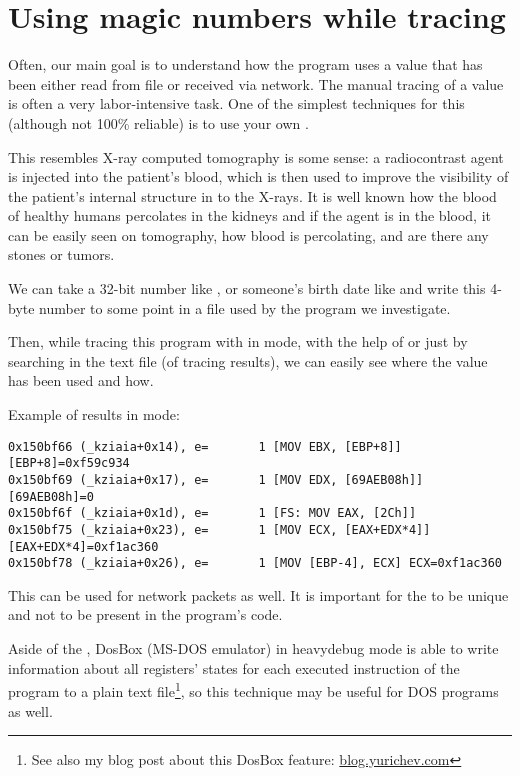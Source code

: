 \section{Using magic numbers while tracing}

Often, our main goal is to understand how the program uses a value that has been either read from file or received via network. 
The manual tracing of a value is often a very labor-intensive task. One of the simplest techniques for this (although not 100\% reliable) 
is to use your own .

This resembles X-ray computed tomography is some sense: a radiocontrast agent is injected into the patient's blood,
which is then used to improve the visibility of the patient's internal structure in to the X-rays.
It is well known how the blood of healthy humans
percolates in the kidneys and if the agent is in the blood, it can be easily seen on tomography, how blood is percolating,
and are there any stones or tumors.

We can take a 32-bit number like , or someone's birth date like 
and write this 4-byte number to some point in a file used by the program we investigate.

\myindex{\GrepUsage}

Then, while tracing this program with \tracer in  mode, with the help of 
or just by searching in the text file (of tracing results), we can easily see where the value has been used and how.

Example 
of  \tracer results in  mode:

\begin{lstlisting}[style=customasmx86]
0x150bf66 (_kziaia+0x14), e=       1 [MOV EBX, [EBP+8]] [EBP+8]=0xf59c934 
0x150bf69 (_kziaia+0x17), e=       1 [MOV EDX, [69AEB08h]] [69AEB08h]=0 
0x150bf6f (_kziaia+0x1d), e=       1 [FS: MOV EAX, [2Ch]] 
0x150bf75 (_kziaia+0x23), e=       1 [MOV ECX, [EAX+EDX*4]] [EAX+EDX*4]=0xf1ac360 
0x150bf78 (_kziaia+0x26), e=       1 [MOV [EBP-4], ECX] ECX=0xf1ac360 
\end{lstlisting}

This can be used for network packets as well.
It is important for the  to be unique and not to be present in the program's code.

\newcommand{\DOSBOXURL}{\href{http://go.yurichev.com/17222}{blog.yurichev.com}}

Aside of 
the \tracer, DosBox (MS-DOS emulator) in heavydebug mode
is able to write information about all registers' states for each executed instruction of the program to a plain text file\footnote{See also my 
blog post about this DosBox feature: \DOSBOXURL{}}, so this technique may be useful for DOS programs as well.

